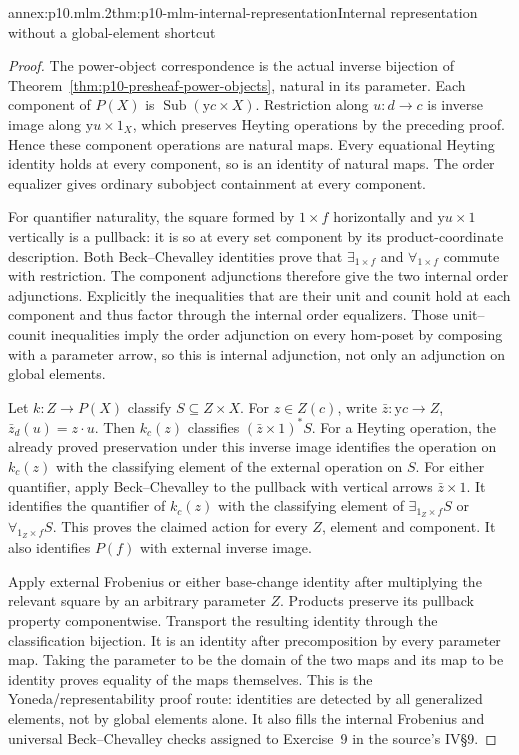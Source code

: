 \begin{annexitem}{annex:p10.mlm.2}{thm:p10-mlm-internal-representation}{Internal representation without a global-element shortcut}
\begin{proof}
The power-object correspondence is the actual inverse bijection of
Theorem~\ref{thm:p10-presheaf-power-objects}, natural in its parameter.
Each component of \(P(X)\) is \(\operatorname{Sub}(\mathrm yc\times X)\).
Restriction along \(u:d\to c\) is inverse image along \(\mathrm yu\times1_X\),
which preserves Heyting operations by the preceding proof. Hence these
component operations are natural maps. Every equational Heyting identity
holds at every component, so is an identity of natural maps. The order
equalizer gives ordinary subobject containment at every component.

For quantifier naturality, the square formed by \(1\times f\) horizontally
and \(\mathrm yu\times1\) vertically is a pullback: it is so at every set
component by its product-coordinate description. Both Beck--Chevalley
identities prove that \(\exists_{1\times f}\) and \(\forall_{1\times f}\) commute
with restriction. The component adjunctions therefore give the two internal
order adjunctions. Explicitly the inequalities that are their unit and
counit hold at each component and thus factor through the internal order
equalizers. Those unit--counit inequalities imply the order adjunction on
every hom-poset by composing with a parameter arrow, so this is internal
adjunction, not only an adjunction on global elements.

Let \(k:Z\to P(X)\) classify \(S\subseteq Z\times X\). For \(z\in Z(c)\),
write \(\bar z:\mathrm yc\to Z\), \(\bar z_d(u)=z\cdot u\).
Then \(k_c(z)\) classifies \((\bar z\times1)^*S\).
For a Heyting operation, the already proved preservation under this inverse
image identifies the operation on \(k_c(z)\) with the classifying element of
the external operation on \(S\). For either quantifier, apply Beck--Chevalley
to the pullback with vertical arrows \(\bar z\times1\). It identifies the
quantifier of \(k_c(z)\) with the classifying element of
\(\exists_{1_Z\times f}S\) or \(\forall_{1_Z\times f}S\).
This proves the claimed action for every \(Z\), element and component.
It also identifies \(P(f)\) with external inverse image.

Apply external Frobenius or either base-change identity after multiplying
the relevant square by an arbitrary parameter \(Z\). Products preserve its
pullback property componentwise. Transport the resulting identity through
the classification bijection. It is an identity after precomposition by
every parameter map. Taking the parameter to be the domain of the two maps
and its map to be identity proves equality of the maps themselves.
This is the Yoneda/representability proof route: identities are detected by
all generalized elements, not by global elements alone. It also fills the
internal Frobenius and universal Beck--Chevalley checks assigned to Exercise~9
in the source's IV\S9.
\end{proof}
\end{annexitem}

